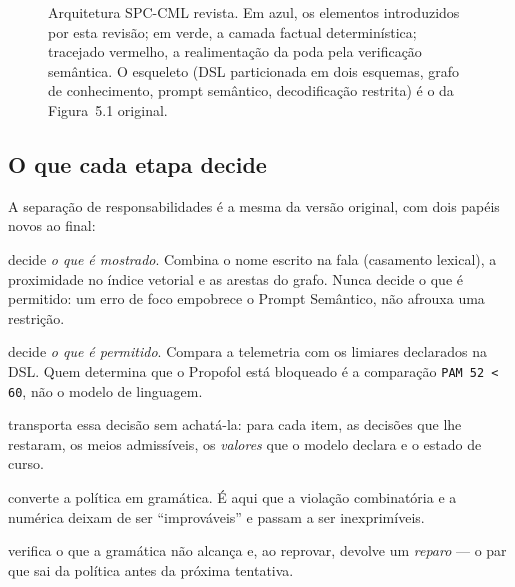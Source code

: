 \documentclass[11pt,a4paper]{article}
\begin{document}
\begin{figure}[htbp]
\caption{Arquitetura SPC-CML revista. Em azul, os elementos introduzidos por
esta revisão; em verde, a camada factual determinística; tracejado vermelho, a
realimentação da poda pela verificação semântica. O esqueleto (DSL particionada
em dois esquemas, grafo de conhecimento, prompt semântico, decodificação
restrita) é o da Figura~5.1 original.}
\label{fig:arquitetura}
\end{figure}

\subsection{O que cada etapa decide}

A separação de responsabilidades é a mesma da versão original, com dois papéis
novos ao final:

\begin{description}[leftmargin=1.4cm,style=nextline]
\item[Foco semântico] decide \emph{o que é mostrado}. Combina o nome escrito na
fala (casamento lexical), a proximidade no índice vetorial e as arestas do grafo.
Nunca decide o que é permitido: um erro de foco empobrece o Prompt Semântico,
não afrouxa uma restrição.
\item[Recuperação determinística] decide \emph{o que é permitido}. Compara a
telemetria com os limiares declarados na DSL. Quem determina que o Propofol está
bloqueado é a comparação \texttt{PAM 52 < 60}, não o modelo de linguagem.
\item[Política por item \textnormal{(novo)}] transporta essa decisão sem
achatá-la: para cada item, as decisões que lhe restaram, os meios admissíveis,
os \emph{valores} que o modelo declara e o estado de curso.
\item[Especialização de $\hat{G}$ \textnormal{(novo)}] converte a política em
gramática. É aqui que a violação combinatória e a numérica deixam de ser
``improváveis'' e passam a ser inexprimíveis.
\item[Contrato do artefato \textnormal{(novo)}] verifica o que a gramática não
alcança e, ao reprovar, devolve um \emph{reparo} --- o par que sai da política
antes da próxima tentativa.
\end{description}

\end{document}
